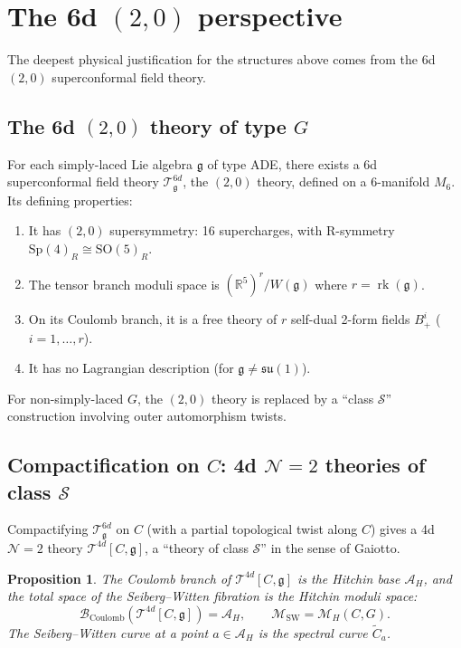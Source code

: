 \documentclass[11pt]{article}
\newtheorem{proposition}[theorem]{Proposition}
\theoremstyle{definition}
\theoremstyle{remark}
\newcommand{\frakg}{\mathfrak{g}}
\newcommand{\cA}{\mathcal{A}}
\newcommand{\cM}{\mathcal{M}}
\newcommand{\cN}{\mathcal{N}}
\DeclareMathOperator{\rk}{rk}
\begin{document}
\section{The 6d $(2,0)$ perspective}
\label{sec:6d-compactification}

The deepest physical justification for the structures above comes from the 6d $(2,0)$ superconformal field theory.

\subsection{The 6d $(2,0)$ theory of type $G$}

For each simply-laced Lie algebra $\frakg$ of type ADE, there exists a 6d superconformal field theory $\mathcal{T}^{6d}_\frakg$, the $(2,0)$ theory, defined on a 6-manifold $M_6$. Its defining properties:
\begin{enumerate}[label=(\roman*)]
 \item It has $(2,0)$ supersymmetry: 16 supercharges, with R-symmetry $\mathrm{Sp}(4)_R \cong \mathrm{SO}(5)_R$.
 \item The tensor branch moduli space is $(\mathbb{R}^5)^r / W(\frakg)$ where $r = \rk(\frakg)$.
 \item On its Coulomb branch, it is a free theory of $r$ self-dual 2-form fields $B^i_+$ ($i = 1, \ldots, r$).
 \item It has no Lagrangian description (for $\frakg \neq \mathfrak{su}(1)$).
\end{enumerate}

For non-simply-laced $G$, the $(2,0)$ theory is replaced by a ``class $\mathcal{S}$'' construction involving outer automorphism twists.

\subsection{Compactification on $C$: 4d $\cN = 2$ theories of class $\mathcal{S}$}

Compactifying $\mathcal{T}^{6d}_\frakg$ on $C$ (with a partial topological twist along $C$) gives a 4d $\cN = 2$ theory $\mathcal{T}^{4d}[C, \frakg]$, a ``theory of class $\mathcal{S}$'' in the sense of Gaiotto.

\begin{proposition}
\label{prop:class-s}
The Coulomb branch of $\mathcal{T}^{4d}[C, \frakg]$ is the Hitchin base $\cA_H$, and the total space of the Seiberg--Witten fibration is the Hitchin moduli space:
\[
 \mathcal{B}_{\mathrm{Coulomb}}(\mathcal{T}^{4d}[C, \frakg]) = \cA_H, \qquad \mathcal{M}_{\mathrm{SW}} = \cM_H(C, G).
\]
The Seiberg--Witten curve at a point $a \in \cA_H$ is the spectral curve $\widetilde{C}_a$.
\end{proposition}
\end{document}
